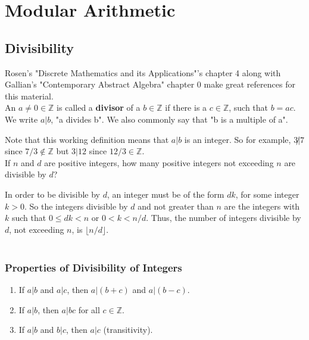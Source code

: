 \section{Modular Arithmetic}



\subsection{Divisibility}

Rosen's "Discrete Mathematics and its Applications"'s chapter 4 along with Gallian's "Contemporary
Abstract Algebra" chapter 0 make great references for this material.
\\

An $a \neq 0 \in \mathbb{Z}$ is called a \textbf{divisor}
of a $b \in \mathbb{Z}$
if there is a $c\in\mathbb{Z}$, such that $b = ac$.
We write $a|b$, "a divides b". We also commonly say that "b is a multiple of a".

Note that this working definition means that $a|b$ is an integer.
So for example, $3\not| 7$ since $7 / 3 \notin \mathbb{Z}$ but $3|12$ since $12/3 \in \mathbb{Z}$.
\\

If $n$ and $d$ are positive integers, how many positive integers not exceeding $n$ are divisible by $d$?

In order to be divisible by $d$, an integer must be of the form $dk$, for some integer $k>0$.
So the integers divisible by $d$ and not greater than $n$ are the integers with $k$ such that
$0 \leq dk < n$
or $0 < k < n/d$.
Thus, the number of integers divisible by $d$, not exceeding $n$, is $\lfloor n / d \rfloor$.
\\~\\


\subsubsection{Properties of Divisibility of Integers}

\begin{enumerate}
    \item If $a|b$ and $a|c$, then $a|(b+c)$ and $a|(b-c)$. \label{divisibility:p1}
    \item If $a|b$, then $a|bc$ for all $c\in\mathbb{Z}$. \label{divisibility:p2}
    \item If $a|b$ and $b|c$, then $a|c$ (transitivity).
\end{enumerate}


